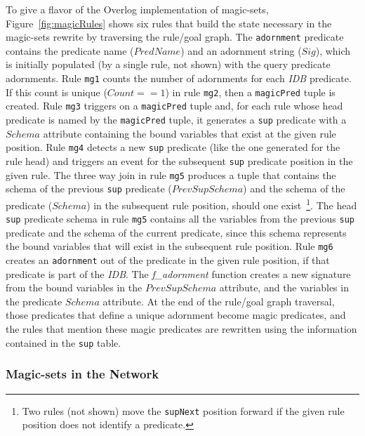 \documentclass{sigmod08}
\newcommand{\ol}[1]{\texttt{\small #1}\xspace}
\begin{document}
To give a flavor of the Overlog implementation of magic-sets,
Figure~\ref{fig:magicRules} shows six rules that build the state
necessary in the 
magic-sets rewrite by traversing the rule/goal graph. 
The \ol{adornment} predicate contains the predicate name ($PredName$) and an
adornment string ($Sig$), which is initially populated (by a single rule, not shown) with
the query predicate adornments. Rule \ol{mg1} counts the number of
adornments for each {\em IDB} predicate. If this count is unique ($Count == 1$) in rule \ol{mg2},
then a \ol{magicPred} tuple is created. Rule \ol{mg3} triggers on a \ol{magicPred} tuple and, for each
rule whose head predicate is named by the \ol{magicPred} tuple, it generates a \ol{sup} predicate
with a $Schema$ attribute containing the bound variables that exist at the given rule position. 
Rule \ol{mg4} detects a new \ol{sup} predicate (like the one generated for the rule head) and triggers 
an event for the subsequent \ol{sup} predicate position in the given rule. The three way join in rule \ol{mg5} 
produces a tuple that contains the schema of the previous \ol{sup} predicate ($PrevSupSchema$) 
and the schema of the predicate ($Schema$) in the subsequent rule position, should one 
exist~\footnote{Two rules (not shown) move the \ol{supNext} position forward if the given rule position does 
not identify a predicate.}. The head \ol{sup} predicate schema in rule \ol{mg5} contains all the variables from the 
previous \ol{sup} predicate and the schema of the current predicate, since this schema represents the bound variables
that will exist in the subsequent rule position. Rule \ol{mg6} creates an \ol{adornment} out of the predicate 
in the given rule position, if that predicate is part of the {\em IDB}. The {\em f\_adornment} 
function creates a new signature from the bound variables in the $PrevSupSchema$ attribute, 
and the variables in the predicate $Schema$ attribute. At the end of the rule/goal graph traversal, 
those predicates that define a unique adornment become magic predicates, and the rules that mention 
these magic predicates are rewritten using the information contained in the \ol{sup} table.

\subsubsection{Magic-sets in the Network}
\end{document}
